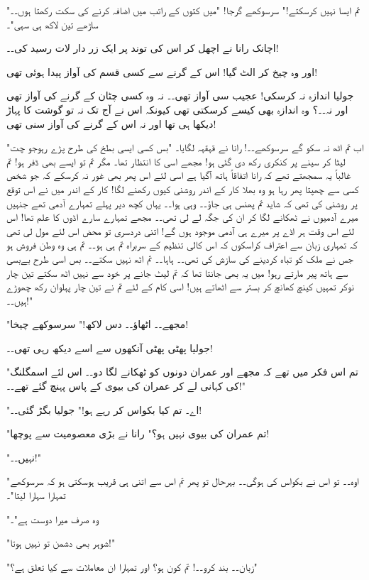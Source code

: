 "تم ایسا نہیں کرسکتے!" سرسوکھے گرجا! "میں کتوں کے راتب میں اضافہ کرنے کی سکت رکھتا ہوں۔۔ ساڑھے تین لاکھ ہی سہی"۔

اچانک رانا نے اچھل کر اس کی توند پر ایک زر دار لات رسید کی۔۔!

اور وہ چیخ کر الٹ گیا! اس کے گرنے سے کسی قسم کی آواز پیدا ہوئی تھی!

جولیا اندازہ نہ کرسکی! عجیب سی آواز تھی۔۔ نہ وہ کسی چٹان کے گرنے کی آواز تھی اور نہ۔۔؟ وہ اندازہ بھی کیسے کرسکتی تھی کیونکہ اس نے آج تک نہ تو گوشت کا پہاڑ دیکھا ہی تھا اور نہ اس کے گرنے کی آواز سنی تھی!

"اب تم اٹھ نہ سکو گے سرسوکھے۔۔! رانا نے قہقہہ لگایا۔ "بس کسی ایسی بطخ کی طرح پڑے رہوجو چت لیٹا کر سینے پر کنکری رکھ دی گئی ہو! مجھے اسی کا انتظار تھا۔ مگر تم تو ایسے بھی ڈفر ہو! تم غالباً یہ سمجھتے تھے کہ رانا اتفاقاً ہاتھ آگیا ہے اسی لئے اس پھر بھی غور نہ کرسکے کہ جو شخص کسی سے چھپتا پھر رہا ہو وہ بھلا کار کے اندر روشنی کیوں رکھنے لگا! کار کے اندر میں نے اس توقع پر روشنی کی تھی کہ شاید تم پھنس ہی جاؤ۔۔ وہی ہوا۔۔ یہاں کچھ دیر پہلے تمہارے آدمی تھے جنہیں میرے آدمیوں نے ٹھکانے لگا کر ان کی جگہ لے لی تھی۔۔ مجھے تمہارے سارے اڈوں کا علم تھا! اس لئے اس وقت ہر اڈے پر میرے ہی آدمی موجود ہوں گے! اتنی دردسری تو محض اس لئے مول لی تھی کہ تمہاری زبان سے اعتراف کراسکوں کہ اس کالی تنظیم کے سربراہ تم ہی ہو۔۔ تم ہی وہ وطن فروش ہو جس نے ملک کو تباہ کردینے کی سازش کی تھی۔۔ ہاہا۔۔ تم اٹھ نہیں سکتے۔۔ بس اسی طرح بےبسی سے ہاتھ پیر مارتے رہو! میں یہ بھی جانتا تھا کہ تم لیٹ جانے پر خود سے نہیں اٹھ سکتے تین چار نوکر تمہیں کینچ کھانچ کر بستر سے اٹھاتے ہیں! اسی کام کے لئے تم نے تین چار پہلوان رکھ چھوڑے ہیں۔۔!"

"مجھے۔۔ اٹھاؤ۔۔ دس لاکھ!" سرسوکھے چیخا!

جولیا پھٹی پھٹی آنکھوں سے اسے دیکھ رہی تھی۔۔!

"تم اس فکر میں تھے کہ مجھے اور عمران دونوں کو ٹھکانے لگا دو۔۔ اس لئے اسمگلنگ کی کہانی لے کر عمران کی بیوی کے پاس پہنچ گئے تھے۔۔!"

"اے۔ تم کیا بکواس کر رہے ہو!" جولیا بگڑ گئی۔۔!

"تم عمران کی بیوی نہیں ہو؟" رانا نے بڑی معصومیت سے پوچھا!

"نہیں۔۔!"

"اوہ۔۔ تو اس نے بکواس کی ہوگی۔۔ بہرحال تو پھر تم اس سے اتنی ہی قریب ہوسکتی ہو کہ سرسوکھے تمہارا سہارا لیتا"۔

"وہ صرف میرا دوست ہے"۔

"شوہر بھی دشمن تو نہیں ہوتا!"

"زبان۔۔ بند کرو۔۔! تم کون ہو؟ اور تمہارا ان معاملات سے کیا تعلق ہے؟"


